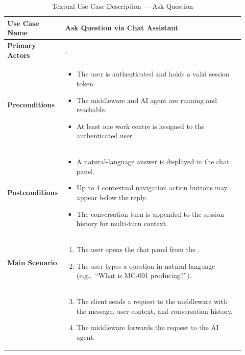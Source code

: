 \begin{longtable}{@{} P{0.21\linewidth} P{0.75\linewidth} @{}}
	\caption{Textual Use Case Description --- Ask Question}
	\label{tab:s5-uc-chat} \\
	\toprule
	\endfirsthead
	\midrule
	\endhead
	
	\bottomrule
	\endlastfoot

	\textbf{Use Case Name}  & Ask Question via Chat Assistant \\
	\midrule
	\textbf{Primary Actors} & ,  \\
 	\midrule
	\textbf{Preconditions} &
	\begin{itemize}[nosep, leftmargin=*]
		\item The user is authenticated and holds a valid session token.
		\item The  middleware and  AI agent are
			running and reachable.
		\item At least one work centre is assigned to the authenticated user.
 	\end{itemize} \\
	\midrule
	\textbf{Postconditions} &
	\begin{itemize}[nosep, leftmargin=*]
		\item A natural-language answer is displayed in the chat panel.
		\item Up to 4 contextual navigation action buttons may appear below the reply.
		\item The conversation turn is appended to the session history for multi-turn context.
 	\end{itemize} \\
 	\midrule
	\textbf{Main Scenario} &
	\begin{enumerate}[nosep, leftmargin=*]
		\item The user opens the chat panel from the .
		\item The user types a question in natural language (e.g.,\ ``What is MC-001 producing?'').
	\end{enumerate} \\ & 
	\begin{enumerate}[resume, nosep, leftmargin=*]
		\setcounter{enumi}{2}
		\item The  client sends a  request
		to the  middleware with the message, user context, and
		conversation history.
		\item The middleware forwards the request to the  AI agent.

\end{enumerate}
\end{longtable}
